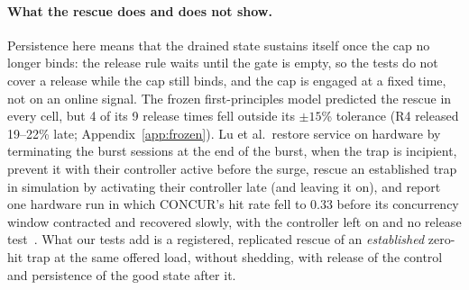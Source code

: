 \paragraph{What the rescue does and does not show.} Persistence here means that the drained state sustains itself once the cap no
longer binds: the release rule waits until the gate is empty, so the tests do not cover a release while the cap still binds, and
the cap is engaged at a fixed time, not on an online signal. The frozen first-principles model predicted the rescue in every cell,
but 4 of its 9 release times fell outside its $\pm15$\% tolerance (R4 released 19--22\% late; Appendix~\ref{app:frozen}). Lu et
al.\ restore service on hardware by terminating the burst sessions at the end of the burst, when the trap is incipient, prevent it
with their controller active before the surge, rescue an established trap in simulation by activating their controller late (and
leaving it on), and report one hardware run in which CONCUR's hit rate fell
to 0.33 before its concurrency window contracted and recovered slowly, with the controller left on and no release
test~\citep{lu2026cachetrap}. What our tests add is a registered, replicated rescue of an \emph{established} zero-hit trap at the same
offered load, without shedding, with release of the control and persistence of the good state after it.
